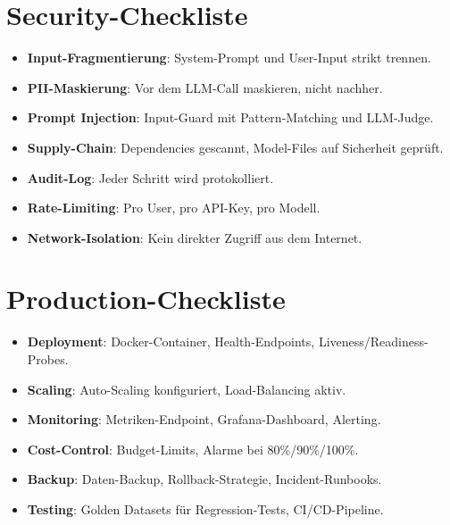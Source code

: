 \section{Security-Checkliste}

\begin{itemize}[leftmargin=*]
     \item \textbf{Input-Fragmentierung}\hspace{0pt}: System-Prompt und User-Input strikt trennen.
     \item \textbf{PII-Maskierung}\hspace{0pt}: Vor dem LLM-Call maskieren, nicht nachher.
     \item \textbf{Prompt Injection}\hspace{0pt}: Input-Guard mit Pattern-Matching und LLM-Judge.
     \item \textbf{Supply-Chain}\hspace{0pt}: Dependencies gescannt, Model-Files auf Sicherheit geprüft.
     \item \textbf{Audit-Log}\hspace{0pt}: Jeder Schritt wird protokolliert.
     \item \textbf{Rate-Limiting}\hspace{0pt}: Pro User, pro API-Key, pro Modell.
     \item \textbf{Network-Isolation}\hspace{0pt}: Kein direkter Zugriff aus dem Internet.
\end{itemize}

\section{Production-Checkliste}

\begin{itemize}[leftmargin=*]
     \item \textbf{Deployment}\hspace{0pt}: Docker-Container, Health-Endpoints, Liveness/Readiness-Probes.
     \item \textbf{Scaling}\hspace{0pt}: Auto-Scaling konfiguriert, Load-Balancing aktiv.
     \item \textbf{Monitoring}\hspace{0pt}: Metriken-Endpoint, Grafana-Dashboard, Alerting.
     \item \textbf{Cost-Control}\hspace{0pt}: Budget-Limits, Alarme bei 80\%/90\%/100\%.
     \item \textbf{Backup}\hspace{0pt}: Daten-Backup, Rollback-Strategie, Incident-Runbooks.
     \item \textbf{Testing}\hspace{0pt}: Golden Datasets für Regression-Tests, CI/CD-Pipeline.
\end{itemize}


